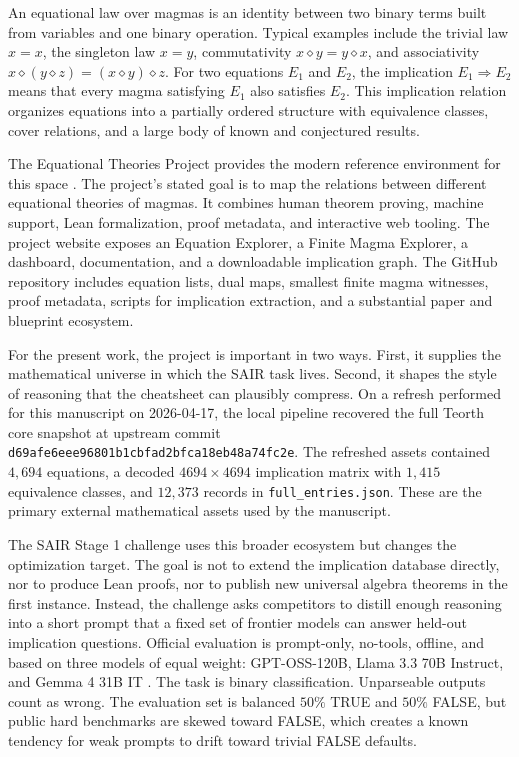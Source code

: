 \documentclass[12pt]{amsart}
\begin{document}
An equational law over magmas is an identity between two binary terms built from variables and one binary operation. Typical examples include the trivial law $x = x$, the singleton law $x = y$, commutativity $x \diamond y = y \diamond x$, and associativity $x \diamond (y \diamond z) = (x \diamond y) \diamond z$. For two equations $E_1$ and $E_2$, the implication $E_1 \Rightarrow E_2$ means that every magma satisfying $E_1$ also satisfies $E_2$. This implication relation organizes equations into a partially ordered structure with equivalence classes, cover relations, and a large body of known and conjectured results.

The Equational Theories Project provides the modern reference environment for this space \cite{ETPRepo2026}. The project's stated goal is to map the relations between different equational theories of magmas. It combines human theorem proving, machine support, Lean formalization, proof metadata, and interactive web tooling. The project website exposes an Equation Explorer, a Finite Magma Explorer, a dashboard, documentation, and a downloadable implication graph. The GitHub repository includes equation lists, dual maps, smallest finite magma witnesses, proof metadata, scripts for implication extraction, and a substantial paper and blueprint ecosystem.

For the present work, the project is important in two ways. First, it supplies the mathematical universe in which the SAIR task lives. Second, it shapes the style of reasoning that the cheatsheet can plausibly compress. On a refresh performed for this manuscript on 2026-04-17, the local pipeline recovered the full Teorth core snapshot at upstream commit \texttt{d69afe6eee96801b1cbfad2bfca18eb48a74fc2e}. The refreshed assets contained $4{,}694$ equations, a decoded $4694 \times 4694$ implication matrix with $1{,}415$ equivalence classes, and $12{,}373$ records in \texttt{full\_entries.json}. These are the primary external mathematical assets used by the manuscript.

The SAIR Stage 1 challenge uses this broader ecosystem but changes the optimization target. The goal is not to extend the implication database directly, nor to produce Lean proofs, nor to publish new universal algebra theorems in the first instance. Instead, the challenge asks competitors to distill enough reasoning into a short prompt that a fixed set of frontier models can answer held-out implication questions. Official evaluation is prompt-only, no-tools, offline, and based on three models of equal weight: GPT-OSS-120B, Llama 3.3 70B Instruct, and Gemma 4 31B IT \cite{SAIRJudge2026}. The task is binary classification. Unparseable outputs count as wrong. The evaluation set is balanced $50\%$ TRUE and $50\%$ FALSE, but public hard benchmarks are skewed toward FALSE, which creates a known tendency for weak prompts to drift toward trivial FALSE defaults.
\end{document}
